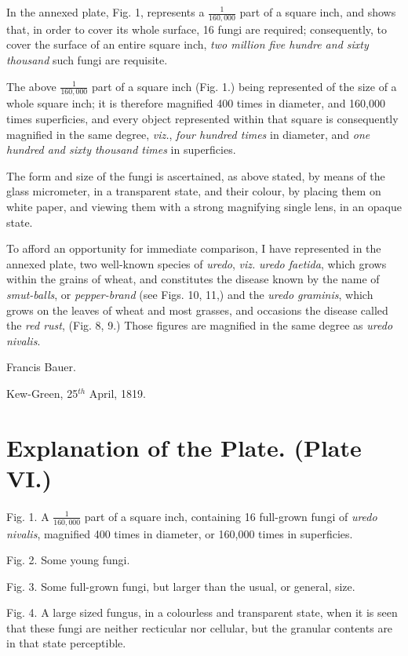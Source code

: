 \documentclass[a4paper, 12pt, oneside]{article}
\begin{document}
In the annexed plate, Fig. 1, represents a $\frac{1}{160,000}$ part of a square inch, and shows that, in order to cover its whole surface, 16 fungi are required; consequently, to cover the surface of an entire square inch, \emph{two million five hundre and sixty thousand} such fungi are requisite.

The above $\frac{1}{160,000}$ part of a square inch (Fig. 1.) being represented of the size of a whole square inch; it is therefore magnified 400 times in diameter, and 160,000 times superficies, and every object represented within that square is consequently magnified in the same degree, \emph{viz.}, \emph{four hundred times} in diameter, and \emph{one hundred and sixty thousand times} in superficies.

The form and size of the fungi is ascertained, as above stated, by means of the glass micrometer, in a transparent state, and their colour, by placing them on white paper, and viewing them with a strong magnifying single lens, in an opaque state.

To afford an opportunity for immediate comparison, I have represented in the annexed plate, two well-known species of \emph{uredo}, \emph{viz.} \emph{uredo faetida}, which grows within the grains of wheat, and constitutes the disease known by the name of \emph{smut-balls}, or \emph{pepper-brand} (see Figs. 10, 11,) and the \emph{uredo graminis}, which grows on the leaves of wheat and most grasses, and occasions the disease called the \emph{red rust}, (Fig. 8, 9.) Those figures are magnified in the same degree as \emph{uredo nivalis}.

Francis Bauer.

Kew-Green, 25$^{th}$ April, 1819.
\clearpage
\section{Explanation of the Plate. (Plate VI.)}
\paragraph{}
Fig. 1. A $\frac{1}{160,000}$ part of a square inch, containing 16 full-grown fungi of \emph{uredo nivalis}, magnified 400 times in diameter, or 160,000 times in superficies.

Fig. 2. Some young fungi.

Fig. 3. Some full-grown fungi, but larger than the usual, or general, size.

Fig. 4. A large sized fungus, in a colourless and transparent state, when it is seen that these fungi are neither recticular nor cellular, but the granular contents are in that state perceptible.
\end{document}
